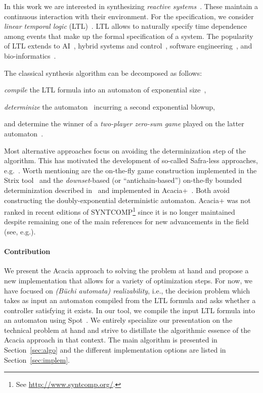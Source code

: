 \documentclass[sigconf,screen,nonacm]{acmart}
\begin{document}
In this work we are interested in synthesizing \emph{reactive
systems}~\cite{hp84}. These maintain a continuous
interaction with their environment. 
For the specification, we consider \emph{linear temporal logic}
(LTL)~\cite{pnueli77}. LTL allows to naturally specify time dependence among
events that make up the formal specification of a system. The popularity of LTL
extends to
AI~\cite{gv16,cm19,gnpw20}, hybrid systems and
control~\cite{bvpyb16}, software engineering~\cite{lpb15}, and
bio-informatics~\cite{abbdfhinprs17}.

The
classical %
synthesis algorithm can be decomposed
as follows:
\begin{enumerate*}
  \item \emph{compile} the LTL formula into an automaton of exponential
    size~\cite{vw84},
  \item \emph{determinize} the automaton~\cite{safra88,piterman07} incurring a
    second exponential blowup,
  \item and determine the winner of a \emph{two-player zero-sum game} played
    on the latter automaton~\cite{pr89}.
\end{enumerate*}
Most alternative approaches focus on avoiding the determinization step of the
algorithm. This has motivated
the development of so-called Safra-less approaches,
e.g.~\cite{kpv06,eks16,ekrs17,tushy17}. Worth mentioning are the on-the-fly
game construction implemented in the Strix tool~\cite{msl18} and the
\emph{downset}-based (or ``antichain-based'') on-the-fly bounded
determinization described in~\cite{fjr09} and implemented in
Acacia+~\cite{bbfjr12}. Both avoid constructing the
doubly-exponential deterministic automaton.
Acacia+ was not ranked in recent editions of SYNTCOMP\footnote{See \url{http://www.syntcomp.org/}.}
since it is no longer maintained despite remaining one of the main
references for new advancements in the field (see,
e.g.\cite{ffrt17,ztlpv17,apsec20,lms20,bltv20}).

\paragraph*{Contribution}
We present the Acacia approach to solving the problem at hand and propose a
new implementation that allows for a variety of optimization steps.  For now,
we have focused on \emph{(B\"uchi automata) realizability}, i.e., the decision
problem which takes as input an automaton compiled from the LTL formula and
asks whether a controller satisfying it exists. In our tool, we compile the
input LTL formula into an automaton using Spot~\cite{duret.16.atva2}.  We
entirely specialize our presentation on the technical problem at hand and
strive to distillate the algorithmic essence of the Acacia approach in that
context. The main algorithm is presented in Section~\ref{sec:algo} and the
different implementation options are listed in Section~\ref{sec:implem}.
\end{document}
